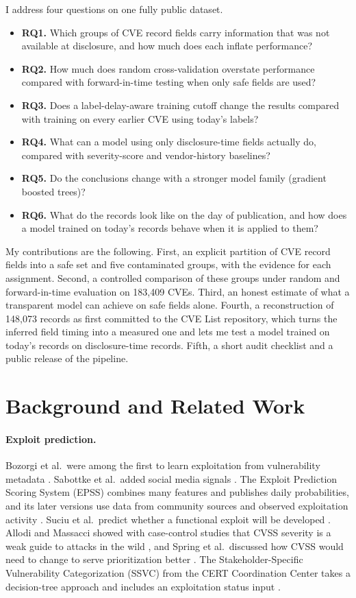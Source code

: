 \documentclass[conference,a4paper]{IEEEtran}
\begin{document}
I address four questions on one fully public dataset.
\begin{itemize}
\item \textbf{RQ1.} Which groups of CVE record fields carry information that was not available at disclosure, and how much does each inflate performance?
\item \textbf{RQ2.} How much does random cross-validation overstate performance compared with forward-in-time testing when only safe fields are used?
\item \textbf{RQ3.} Does a label-delay-aware training cutoff change the results compared with training on every earlier CVE using today's labels?
\item \textbf{RQ4.} What can a model using only disclosure-time fields actually do, compared with severity-score and vendor-history baselines?
\item \textbf{RQ5.} Do the conclusions change with a stronger model family (gradient boosted trees)?
\item \textbf{RQ6.} What do the records look like on the day of publication, and how does a model trained on today's records behave when it is applied to them?
\end{itemize}

My contributions are the following. First, an explicit partition of CVE record fields into a safe set and five contaminated groups, with the evidence for each assignment. Second, a controlled comparison of these groups under random and forward-in-time evaluation on 183,409 CVEs. Third, an honest estimate of what a transparent model can achieve on safe fields alone. Fourth, a reconstruction of 148,073 records as first committed to the CVE List repository, which turns the inferred field timing into a measured one and lets me test a model trained on today's records on disclosure-time records. Fifth, a short audit checklist and a public release of the pipeline.

\section{Background and Related Work}

\paragraph{Exploit prediction.} Bozorgi et al.\ were among the first to learn exploitation from vulnerability metadata \cite{bozorgi2010}. Sabottke et al.\ added social media signals \cite{sabottke2015}. The Exploit Prediction Scoring System (EPSS) combines many features and publishes daily probabilities, and its later versions use data from community sources and observed exploitation activity \cite{jacobs2019,jacobs2023}. Suciu et al.\ predict whether a functional exploit will be developed \cite{suciu2022}. Allodi and Massacci showed with case-control studies that CVSS severity is a weak guide to attacks in the wild \cite{allodi2014}, and Spring et al.\ discussed how CVSS would need to change to serve prioritization better \cite{spring2021}. The Stakeholder-Specific Vulnerability Categorization (SSVC) from the CERT Coordination Center takes a decision-tree approach and includes an exploitation status input \cite{ssvc}.
\end{document}
